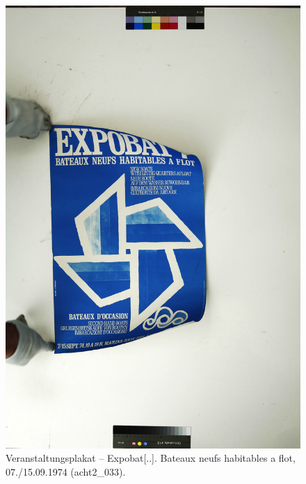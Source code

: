 \documentclass[a4paper,12pt,ngerman]{article}
\begin{document}
\newpage
\begin{figure}[ht]
\includegraphics[width=\linewidth]{Abbildung_51_(acht2_033)}
\centering
\caption{Veranstaltungsplakat – Expobat[..]. Bateaux neufs habitables a flot, 07./15.09.1974 (acht2\_033).}
\end{figure}
\end{document}
